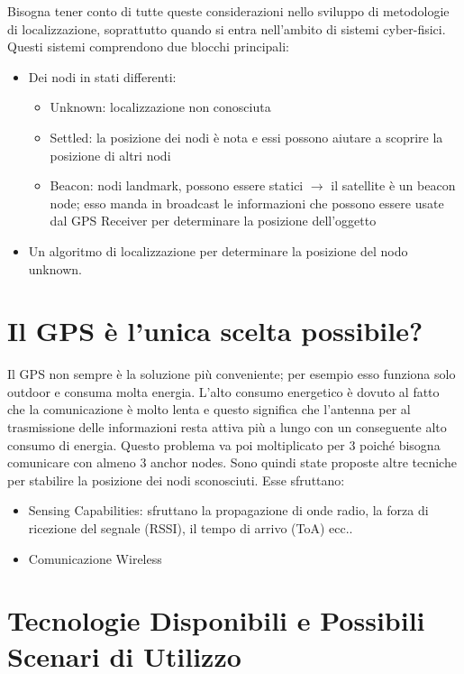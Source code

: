 Bisogna tener conto di tutte queste considerazioni nello sviluppo di
metodologie di localizzazione, soprattutto quando si entra nell'ambito di
sistemi cyber-fisici.
Questi sistemi comprendono due blocchi principali:
\begin{itemize}
    \item Dei nodi in stati differenti:
    \begin{itemize}
        \item Unknown: localizzazione non conosciuta
        \item Settled: la posizione dei nodi è nota e essi
            possono aiutare a scoprire la posizione di altri nodi
        \item Beacon: nodi landmark, possono essere statici
            $\rightarrow$ il satellite è un beacon node; esso manda in broadcast le
            informazioni che possono essere usate dal GPS Receiver per determinare la
            posizione dell'oggetto
    \end{itemize}
    \item Un algoritmo di localizzazione per determinare la
        posizione del nodo unknown.
\end{itemize}

\section{Il GPS è l'unica scelta possibile?}\label{subsubsec3.1.1}
Il GPS non sempre è la soluzione più conveniente; per esempio
esso funziona solo outdoor e consuma molta energia.
L'alto consumo energetico è dovuto al fatto che la comunicazione è molto lenta
e questo significa che l'antenna per al trasmissione delle informazioni resta
attiva più a lungo con un conseguente alto consumo di energia.
Questo problema va poi moltiplicato per 3 poiché bisogna comunicare con almeno
3 anchor nodes.
Sono quindi state proposte altre tecniche per stabilire la
posizione dei nodi sconosciuti. Esse sfruttano:
\begin{itemize}
    \item Sensing Capabilities: sfruttano la propagazione di onde radio, la
    forza di ricezione del segnale (RSSI), il tempo di arrivo (ToA) ecc..
    \item Comunicazione Wireless
\end{itemize}

\section{Tecnologie Disponibili e Possibili Scenari di Utilizzo}\label{subsec3.2}

